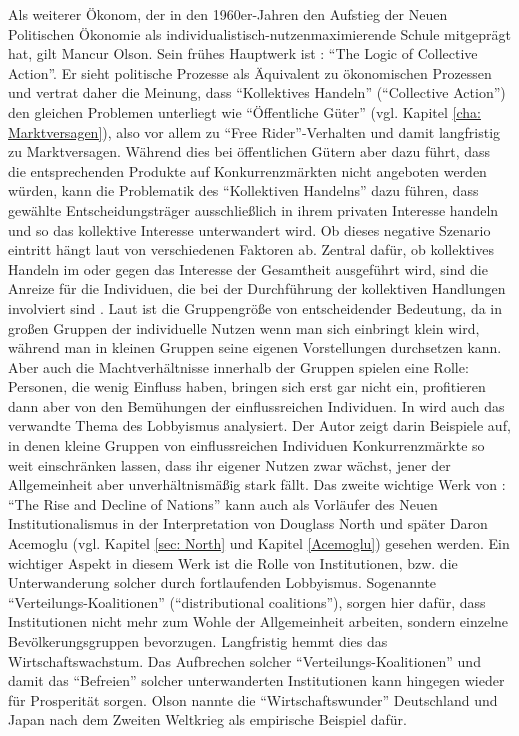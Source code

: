 Als weiterer Ökonom, der in den 1960er-Jahren den Aufstieg der Neuen Politischen Ökonomie als individualistisch-nutzenmaximierende Schule mitgeprägt hat, gilt Mancur Olson. Sein frühes Hauptwerk ist \textcite{Olson1965}: "`The Logic of Collective Action"'. Er sieht politische Prozesse als Äquivalent zu ökonomischen Prozessen und vertrat daher die Meinung, dass "`Kollektives Handeln"' ("`Collective Action"') den gleichen Problemen unterliegt wie "`Öffentliche Güter"' (vgl. Kapitel \ref{cha: Marktversagen}), also vor allem zu "`Free Rider"'-Verhalten und damit langfristig zu Marktversagen. Während dies bei öffentlichen Gütern aber dazu führt, dass die entsprechenden Produkte auf Konkurrenzmärkten nicht angeboten werden würden, kann die Problematik des "`Kollektiven Handelns"' dazu führen, dass gewählte Entscheidungsträger ausschließlich in ihrem privaten Interesse handeln und so das kollektive Interesse unterwandert wird. Ob dieses negative Szenario eintritt hängt laut \textcite{Olson1965} von verschiedenen Faktoren ab. Zentral dafür, ob kollektives Handeln im oder gegen das Interesse der Gesamtheit ausgeführt wird, sind die Anreize für die Individuen, die bei der Durchführung der kollektiven Handlungen involviert sind \parencite[S. 446]{Dixit1999}. Laut \textcite{Olson1965} ist die Gruppengröße von entscheidender Bedeutung, da in großen Gruppen der individuelle Nutzen wenn man sich einbringt klein wird, während man in kleinen Gruppen seine eigenen Vorstellungen durchsetzen kann. Aber auch die Machtverhältnisse innerhalb der Gruppen spielen eine Rolle: Personen, die wenig Einfluss haben, bringen sich erst gar nicht ein, profitieren dann aber von den Bemühungen der einflussreichen Individuen. In \textcite{Olson1965} wird auch das verwandte Thema des Lobbyismus analysiert. Der Autor zeigt darin Beispiele auf, in denen kleine Gruppen von einflussreichen Individuen Konkurrenzmärkte so weit einschränken lassen, dass ihr eigener Nutzen zwar wächst, jener der Allgemeinheit aber unverhältnismäßig stark fällt. 
Das zweite wichtige Werk von \textcite{Olson1982}: "`The Rise and Decline of Nations"' kann auch als Vorläufer des Neuen Institutionalismus in der Interpretation von Douglass North und später Daron Acemoglu (vgl. Kapitel \ref{sec: North} und Kapitel \ref{Acemoglu}) gesehen werden. Ein wichtiger Aspekt in diesem Werk ist die Rolle von Institutionen, bzw. die Unterwanderung solcher durch fortlaufenden Lobbyismus. Sogenannte "`Verteilungs-Koalitionen"' ("`distributional coalitions"'), sorgen hier dafür, dass Institutionen nicht mehr zum Wohle der Allgemeinheit arbeiten, sondern einzelne Bevölkerungsgruppen bevorzugen. Langfristig hemmt dies das Wirtschaftswachstum. Das Aufbrechen solcher "`Verteilungs-Koalitionen"' und damit das "`Befreien"' solcher unterwanderten Institutionen kann hingegen wieder für Prosperität sorgen. Olson nannte die "`Wirtschaftswunder"' Deutschland und Japan nach dem Zweiten Weltkrieg als empirische Beispiel dafür.

